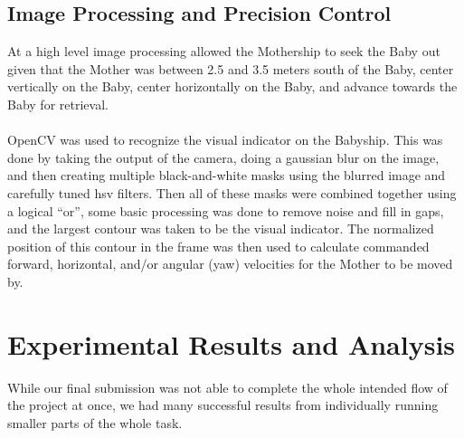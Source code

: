 \documentclass[11pt]{article}
\begin{document}
\subsection{Image Processing and Precision Control}
At a high level image processing allowed the Mothership to seek the Baby out given that the Mother was between 2.5 and 3.5 meters south of the Baby, center vertically on the Baby, center horizontally on the Baby, and advance towards the Baby for retrieval.\\\\
\noindent
OpenCV was used to recognize the visual indicator on the Babyship. This was done by taking the output of the camera, doing a gaussian blur on the image, and then creating multiple black-and-white masks using the blurred image and carefully tuned hsv filters. Then all of these masks were combined together using a logical “or”, some basic processing was done to remove noise and fill in gaps, and the largest contour was taken to be the visual indicator. The normalized position of this contour in the frame was then used to calculate commanded forward, horizontal, and/or angular (yaw) velocities for the Mother to be moved by.
\section{Experimental Results and Analysis}
While our final submission was not able to complete the whole intended flow of the project at once, we had many successful results from individually running smaller parts of the whole task.
\end{document}
